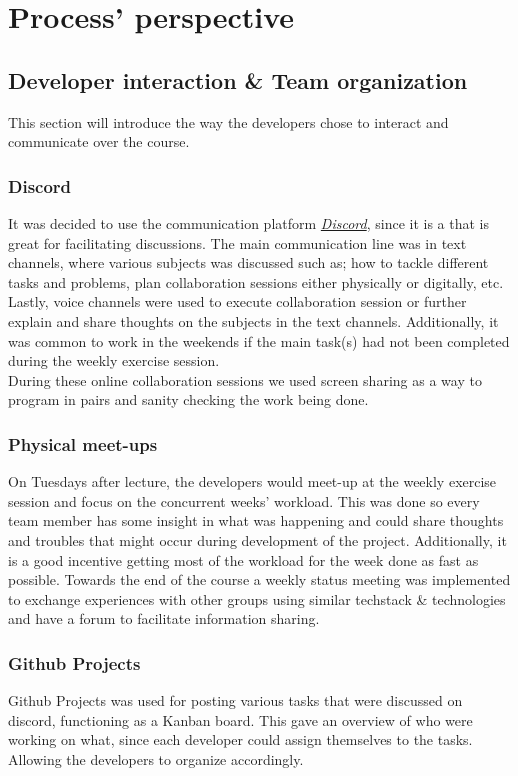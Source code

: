 \section{Process' perspective}
\subsection{Developer interaction \& Team organization}
This section will introduce the way the developers chose to interact and communicate over the course. 

\subsubsection{Discord}
It was decided to use the communication platform \href{https://discord.com/}{\textit{Discord}}, since it is a that is great for facilitating discussions. The main communication line was in text channels, where various subjects was discussed such as; how to tackle different tasks and problems, plan collaboration sessions either physically or digitally, etc. Lastly, voice channels were used to execute collaboration session or further explain and share thoughts on the subjects in the text channels. Additionally, it was common to work in the weekends if the main task(s) had not been completed during the weekly exercise session. \\
During these online collaboration sessions we used screen sharing as a way to program in pairs and sanity checking the work being done.

\subsubsection{Physical meet-ups}
On Tuesdays after lecture, the developers would meet-up at the weekly exercise session and focus on the concurrent weeks' workload. This was done so every team member has some insight in what was happening and could share thoughts and troubles that might occur during development of the project. Additionally, it is a good incentive getting most of the workload for the week done as fast as possible. Towards the end of the course a weekly status meeting was implemented to exchange experiences with other groups using similar techstack \& technologies and have a forum to facilitate information sharing.

\subsubsection{Github Projects}
Github Projects was used for posting various tasks that were discussed on discord, functioning as a Kanban board. This gave an overview of who were working on what, since each developer could assign themselves to the tasks. Allowing the developers to organize accordingly.

